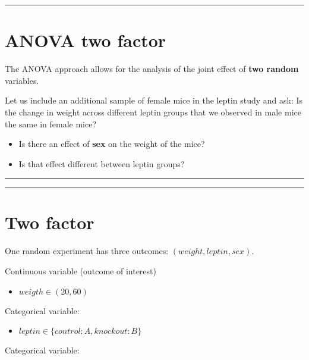 \documentclass[
]{book}
\providecommand{\tightlist}{%
  \setlength{\itemsep}{0pt}\setlength{\parskip}{0pt}}
\begin{document}
\begin{center}\rule{0.5\linewidth}{0.5pt}\end{center}

\hypertarget{anova-two-factor}{%
\section{ANOVA two factor}\label{anova-two-factor}}

The ANOVA approach allows for the analysis of the joint effect of \textbf{two random} variables.

Let us include an additional sample of female mice in the leptin study and ask: Is the change in weight across different leptin groups that we observed in male mice the same in female mice?

\begin{itemize}
\item
  Is there an effect of \textbf{sex} on the weight of the mice?
\item
  Is that effect different between leptin groups?
\end{itemize}

\begin{center}\rule{0.5\linewidth}{0.5pt}\end{center}

\begin{center}\rule{0.5\linewidth}{0.5pt}\end{center}

\hypertarget{two-factor}{%
\section{Two factor}\label{two-factor}}

One random experiment has three outcomes: \((weight, leptin, sex)\).

Continuous variable (outcome of interest)

\begin{itemize}
\tightlist
\item
  \(weigth \in (20, 60)\)
\end{itemize}

Categorical variable:

\begin{itemize}
\tightlist
\item
  \(leptin \in \{control:A,knockout:B\}\)
\end{itemize}

Categorical variable:
\end{document}
